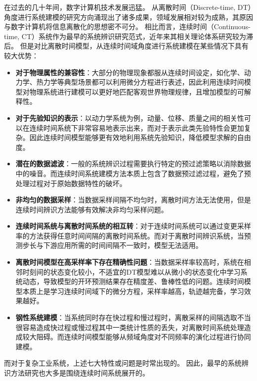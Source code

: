 在过去的几十年间，数字计算机技术发展迅猛。
从离散时间（Discrete-time, DT）角度进行系统建模的研究方向涌现出了诸多成果，领域发展相对较为成熟，其原因与数字计算机将信息离散化的思想密不可分。
相比而言，连续时间（Continuous-time, CT）系统作为最早的系统辨识研究范式，近年来其相关理论体系研究较为滞后。
但是对比离散时间模型，从连续时间域角度进行系统建模在某些情况下具有较大优势：
\begin{itemize}
\setlength{\itemsep}{0pt}
\setlength{\parsep}{0pt}
\setlength{\parskip}{0pt}
\setlength{\topsep}{0pt}
\setlength{\partopsep}{0pt}
\item	\textbf{对于物理属性的兼容性}：大部分的物理现象都服从连续时间设定，如化学、动力学、热力学等典型场景都可以利用微分方程进行表述，因此利用连续时间模型对物理系统进行建模可以更好地匹配客观世界物理规律，且增加模型的可解释性。
\item	\textbf{对于先验知识的表示}：以动力学系统为例，动量、位移、质量之间的相关性可以在连续时间系统下非常容易地表示出来，而对于表示此类先验特性会更加复杂。因此连续时间模型能够更有效地利用系统先验知识，降低模型求解的自由度。
\item \textbf{潜在的数据滤波}：一般的系统辨识过程需要执行特定的预过滤策略以消除数据中的噪音。而连续时间系统建模方法本质上包含了数据预过滤过程，避免了预处理过程对于原始数据特性的破坏。
\item \textbf{非均匀的数据采样}：当数据采样间隔不均匀时，离散时间方法无法使用，但是连续时间辨识方法能够有效解决非均匀采样问题。
\item \textbf{连续时间系统与离散时间系统的相互转}：对于连续时间系统可以通过变更采样率的方法获得任意时间间隔的离散时间系统。而对于离散时间辨识系统，当预测步长与下游应用所需的时间间隔不一致时，模型无法适用。
\item \textbf{离散时间模型在高采样率下存在精确性问题}：当数据采样率较高时，系统在相邻时刻间的状态变化较小，不适宜的DT模型难以从微小的状态变化中学习系统动态，导致模型的开环预测结果存在精度差、鲁棒性低的问题。连续时间模型本质上是学习连续时间域下的微分方程，采样率越高，轨迹越完备，学习效果越好。
\item \textbf{钢性系统建模}：当系统同时存在快过程和慢过程时，离散采样的间隔选取不当很容易造成快过程或慢过程其中一类统计性质的丢失，对离散时间系统处理造成较大阻碍。而连续时间模型能够从频域角度对不同频率的演化过程进行协同建模。
\end{itemize}
而对于复杂工业系统，上述七大特性或问题是时常出现的。
因此，最早的系统辨识方法研究也大多是围绕连续时间系统展开的。
